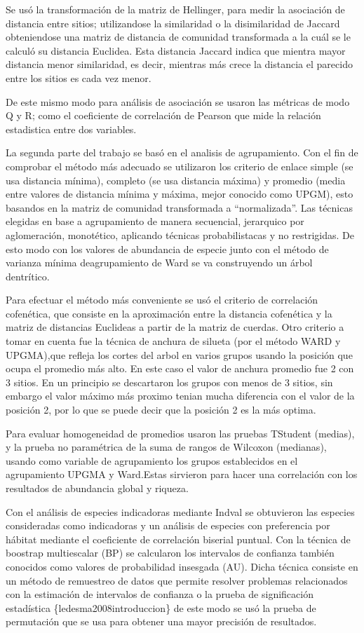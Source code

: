 \documentclass[11pt,]{article}
\begin{document}
Se usó la transformación de la matriz de Hellinger, para medir la
asociación de distancia entre sitios; utilizandose la similaridad o la
disimilaridad de Jaccard obteniendose una matriz de distancia de
comunidad transformada a la cuál se le calculó su distancia Euclidea.
Esta distancia Jaccard indica que mientra mayor distancia menor
similaridad, es decir, mientras más crece la distancia el parecido entre
los sitios es cada vez menor.

De este mismo modo para análisis de asociación se usaron las métricas de
modo Q y R; como el coeficiente de correlación de Pearson que mide la
relación estadistica entre dos variables.

La segunda parte del trabajo se basó en el analisis de agrupamiento. Con
el fin de comprobar el método más adecuado se utilizaron los criterio de
enlace simple (se usa distancia mínima), completo (se usa distancia
máxima) y promedio (media entre valores de distancia mínima y máxima,
mejor conocido como UPGM), esto basandos en la matriz de comunidad
transformada a ``normalizada''. Las técnicas elegidas en base a
agrupamiento de manera secuencial, jerarquico por aglomeración,
monotético, aplicando técnicas probabilistacas y no restrigidas. De esto
modo con los valores de abundancia de especie junto con el método de
varianza mínima deagrupamiento de Ward se va construyendo un árbol
dentrítico.

Para efectuar el método más conveniente se usó el criterio de
correlación cofenética, que consiste en la aproximación entre la
distancia cofenética y la matriz de distancias Euclideas a partir de la
matriz de cuerdas. Otro criterio a tomar en cuenta fue la técnica de
anchura de silueta (por el método WARD y UPGMA),que refleja los cortes
del arbol en varios grupos usando la posición que ocupa el promedio más
alto. En este caso el valor de anchura promedio fue 2 con 3 sitios. En
un principio se descartaron los grupos con menos de 3 sitios, sin
embargo el valor máximo más proximo tenian mucha diferencia con el valor
de la posición 2, por lo que se puede decir que la posición 2 es la más
optima.

Para evaluar homogeneidad de promedios usaron las pruebas TStudent
(medias), y la prueba no paramétrica de la suma de rangos de Wilcoxon
(medianas), usando como variable de agrupamiento los grupos establecidos
en el agrupamiento UPGMA y Ward.Estas sirvieron para hacer una
correlación con los resultados de abundancia global y riqueza.

Con el análisis de especies indicadoras mediante Indval se obtuvieron
las especies consideradas como indicadoras y un análisis de especies con
preferencia por hábitat mediante el coeficiente de correlación biserial
puntual. Con la técnica de boostrap multiescalar (BP) se calcularon los
intervalos de confianza también conocidos como valores de probabilidad
insesgada (AU). Dicha técnica consiste en un método de remuestreo de
datos que permite resolver problemas relacionados con la estimación de
intervalos de confianza o la prueba de significación estadística
\{ledesma2008introduccion\} de este modo se usó la prueba de permutación
que se usa para obtener una mayor precisión de resultados.
\end{document}
